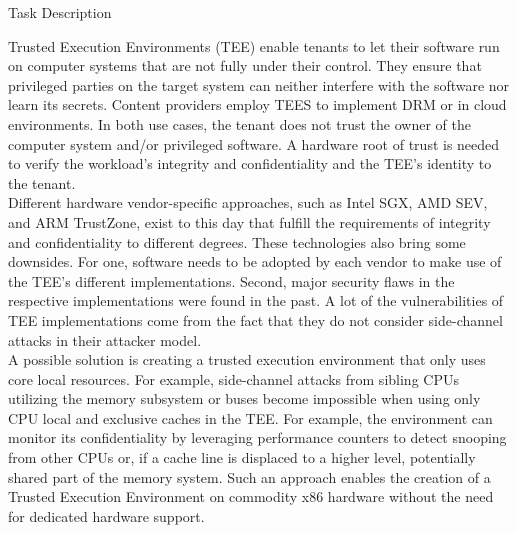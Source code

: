 \begin{center}
    \Large
    Task Description
\end{center}

Trusted Execution Environments (TEE) enable tenants to let their software run on
computer systems that are not fully under their control. They ensure that
privileged parties on the target system can neither interfere with the software
nor learn its secrets. Content providers employ TEES to implement DRM or in
cloud environments. In both use cases, the tenant does not trust the owner of
the computer system and/or privileged software. A hardware root of trust is
needed to verify the workload's integrity and confidentiality and the TEE's
identity to the tenant.\\

Different hardware vendor-specific approaches, such as Intel SGX, AMD SEV, and
ARM TrustZone, exist to this day that fulfill the requirements of integrity and
confidentiality to different degrees. These technologies also bring some
downsides. For one, software needs to be adopted by each vendor to make use of
the TEE's different implementations. Second, major security flaws in the
respective implementations were found in the past. A lot of the vulnerabilities
of TEE implementations come from the fact that they do not consider side-channel
attacks in their attacker model.\\

A possible solution is creating a trusted execution environment that only uses
core local resources. For example, side-channel attacks from sibling CPUs
utilizing the memory subsystem or buses become impossible when using only CPU
local and exclusive caches in the TEE. For example, the environment can monitor
its confidentiality by leveraging performance counters to detect snooping from
other CPUs or, if a cache line is displaced to a higher level, potentially
shared part of the memory system. Such an approach enables the creation of a
Trusted Execution Environment on commodity x86 hardware without the need for
dedicated hardware support.\\

